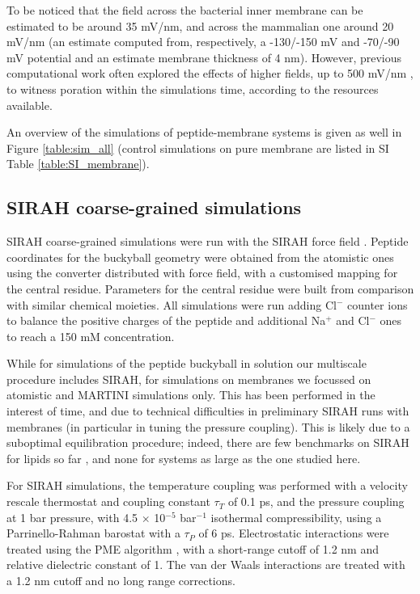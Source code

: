 To be noticed that the field across the bacterial inner membrane can be estimated to be around 35 mV/nm, and across the mammalian one around 20 mV/nm (an estimate computed from, respectively, a -130/-150 mV and -70/-90 mV potential \citep{Yeaman2003,Wilson2011} and an estimate membrane thickness of 4 nm). However, previous computational work often explored the effects of higher fields, up to 500 mV/nm \citep{Tieleman2004, Bockmann2008, Piggot2011}, to witness poration within the simulations time, according to the resources available.

An overview of the simulations of peptide-membrane systems is given as well in Figure \ref{table:sim_all} (control simulations on pure membrane are listed in SI Table \ref{table:SI_membrane}).

\subsection{SIRAH coarse-grained simulations}
SIRAH coarse-grained simulations were run with the SIRAH force field \citep{Machado2018}. Peptide coordinates for the buckyball geometry were obtained from the atomistic ones using the converter distributed with force field, with a customised mapping for the central residue. Parameters for the central residue were built from comparison with similar chemical moieties. All simulations were run adding Cl$^-$ counter ions to balance the positive charges of the peptide and additional Na$^+$  and Cl$^-$ ones to reach a 150 mM concentration.

While for simulations of the peptide buckyball in solution our multiscale procedure includes SIRAH, for simulations on membranes we focussed on atomistic and MARTINI simulations only. This has been performed in the interest of time, and due to technical difficulties in preliminary SIRAH runs with membranes (in particular in tuning the pressure coupling).
%
This is likely due to a suboptimal equilibration procedure; indeed, there are few benchmarks on SIRAH for lipids so far \citep{Barrera2019}, and none for systems as large as the one studied here.

For SIRAH simulations, the temperature coupling was performed with a velocity rescale thermostat \citep{Bussi2007} and coupling constant $\tau _T$ of 0.1 ps, and the pressure coupling at 1 bar pressure, with 4.5 $\times$ 10$^{-5}$ bar$^{-1}$ isothermal compressibility, using a Parrinello-Rahman barostat \citep{Parrinello1981} with a $\tau _P$ of 6 ps. Electrostatic interactions were treated using the PME algorithm \citep{Essmann1995}, with a short-range cutoff of 1.2 nm and relative dielectric constant of 1. The van der Waals interactions are treated with a 1.2 nm cutoff and no long range corrections.

